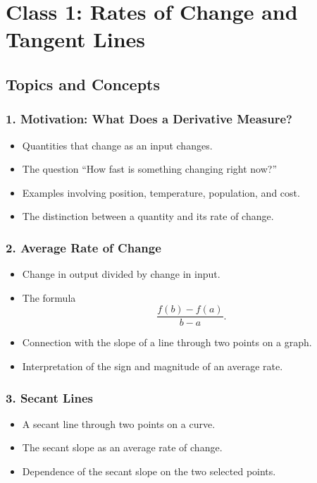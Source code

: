 \documentclass{article}
\begin{document}
\section*{Class 1: Rates of Change and Tangent Lines}

\subsection*{Topics and Concepts}

\subsubsection*{1. Motivation: What Does a Derivative Measure?}

\begin{itemize}
    \item Quantities that change as an input changes.
    \item The question ``How fast is something changing right now?''
    \item Examples involving position, temperature, population, and cost.
    \item The distinction between a quantity and its rate of change.
\end{itemize}

\subsubsection*{2. Average Rate of Change}

\begin{itemize}
    \item Change in output divided by change in input.
    \item The formula
    \[
        \frac{f(b)-f(a)}{b-a}.
    \]
    \item Connection with the slope of a line through two points on a graph.
    \item Interpretation of the sign and magnitude of an average rate.
\end{itemize}

\subsubsection*{3. Secant Lines}

\begin{itemize}
    \item A secant line through two points on a curve.
    \item The secant slope as an average rate of change.
    \item Dependence of the secant slope on the two selected points.
\end{itemize}
\end{document}
